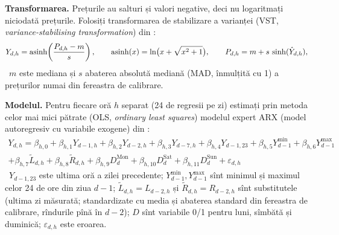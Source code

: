 %
{\textbf{Transformarea.} Prețurile au salturi și valori negative, deci nu logaritmați niciodată prețurile.
Folosiți transformarea de stabilizare a varianței (VST, \emph{variance-stabilising transformation}) din \cite{Uniejewski2018}:}
\begin{equation}
Y_{d,h}=\operatorname{asinh}\!\left(\frac{P_{d,h}-m}{s}\right),\qquad \operatorname{asinh}(x)=\ln\!\big(x+\sqrt{x^2+1}\big),\qquad P_{d,h}=m+s\,\sinh(\hat Y_{d,h}),
\end{equation}
%
{\where\ $m$ este mediana și $s$ abaterea absolută mediană (MAD, înmulțită cu 1) a prețurilor numai din fereastra de calibrare.}

%
{\textbf{Modelul.} Pentru fiecare oră $h$ separat (24 de regresii pe zi) estimați prin metoda celor mai mici pătrate (OLS, \emph{ordinary least squares}) modelul expert ARX
(model autoregresiv cu variabile exogene) din \cite{Ziel2018}:}
\begin{multline}
Y_{d,h}=\beta_{h,0}+\beta_{h,1}Y_{d-1,h}+\beta_{h,2}Y_{d-2,h}+\beta_{h,3}Y_{d-7,h}+\beta_{h,4}Y_{d-1,23}+\beta_{h,5}Y^{\min}_{d-1}+\beta_{h,6}Y^{\max}_{d-1}\\
+\beta_{h,7}\tilde L_{d,h}+\beta_{h,8}\tilde R_{d,h}+\beta_{h,9}D^{\text{Mon}}_d+\beta_{h,10}D^{\text{Sat}}_d+\beta_{h,11}D^{\text{Sun}}_d+\varepsilon_{d,h}
\end{multline}
%
{\where\ $Y_{d-1,23}$ este ultima oră a zilei precedente; $Y^{\min}_{d-1},Y^{\max}_{d-1}$ sînt minimul și maximul celor 24 de ore din ziua $d-1$;
$\tilde L_{d,h}=L_{d-2,h}$ și $\tilde R_{d,h}=R_{d-2,h}$ sînt substitutele (ultima zi măsurată; standardizate cu media și abaterea standard din fereastra de calibrare, rîndurile pînă în $d-2$);
$D$ sînt variabile 0/1 pentru luni, sîmbătă și duminică; $\varepsilon_{d,h}$ este eroarea.}

